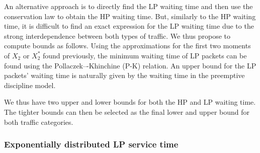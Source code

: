 \documentclass[11pt,journal,oneside,onecolumn,draftclsnofoot]{IEEEtran}
\begin{document}
An alternative approach is to directly find the LP waiting time and then use the conservation law to obtain the HP waiting time. But, similarly to the HP waiting time, it is difficult to find an exact expression for the LP waiting time due to the strong interdependence between both types of traffic. We thus propose to compute bounds as follows.
Using the approximations for the first two moments of $X_2$ or $X^*_2$ found previously, the minimum waiting time of LP packets can be found using the {Pollaczek–-Khinchine} ({P-K}) relation. An upper bound for the LP packets' waiting time is naturally given by the waiting time in the preemptive discipline model. 


We thus have two upper and lower bounds for both the HP and LP waiting time. The tighter bounds can then be selected as the final lower and upper bound for both traffic categories.



\subsubsection{Exponentially distributed LP service time}
\label{sec:preempt_failure_exp}
\end{document}
